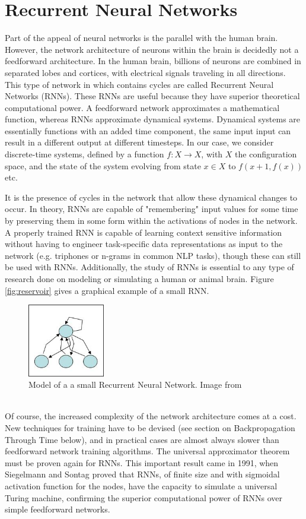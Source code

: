 \documentclass[12pt,oneside]{CUNY_CS_PhD}
\begin{document}
\section{Recurrent Neural Networks}
Part of the appeal of neural networks is the parallel with the human brain. However, the network architecture of neurons within the brain is decidedly not a feedforward architecture. In the human brain, billions of neurons are combined in separated lobes and cortices, with electrical signals traveling in all directions. This type of network in which contains cycles are called Recurrent Neural Networks (RNNs). These RNNs are useful because they have superior theoretical computational power. A feedforward network approximates a mathematical function, whereas RNNs approximate dynamical systems. Dynamical systems are essentially functions with an added time component, the same input input can result in a different output at different timesteps. In our case, we consider discrete-time systems, defined by a function $f: X \rightarrow X$, with $X$ the configuration space, and the state of the system evolving from state $x \in X$ to $f(x+1, f(x))$ etc. 

It is the presence of cycles in the network that allow these dynamical changes to occur. In theory, RNNs are capable of "remembering" input values for some time by preserving them in some form within the activations of nodes in the network. A properly trained RNN is capable of learning context sensitive information without having to engineer task-specific data representations as input to the network (e.g. triphones or n-grams in common NLP tasks), though these can still be used with RNNs. Additionally, the study of RNNs is essential to any type of research done on modeling or simulating a human or animal brain. Figure \ref{fig:reservoir} gives a graphical example of a small RNN.
\begin{figure}[!htbp]
\centering
\includegraphics[width=0.3\textwidth]{pictures/rnn.png}
\caption{Model of a a small Recurrent Neural Network. Image from \cite{rnn} }
\label{fig:rnn}
\end{figure}\\
Of course, the increased complexity of the network architecture comes at a cost. New techniques for training have to be devised (see section on Backpropagation Through Time below),
 and in practical cases are almost always slower than feedforward network training algorithms. The universal approximator theorem must be proven again for RNNs. This important result came in 1991, when Siegelmann and Sontag \cite{Siegelmann91turingcomputability} proved that RNNs, of finite size and with sigmoidal activation function for the nodes, have the capacity to simulate a universal Turing machine, confirming the superior computational power of RNNs over simple feedforward networks.
\end{document}
